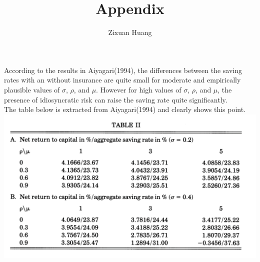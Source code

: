 \documentclass[]{article}
\title{Appendix}
\author{Zixuan Huang}
\begin{document}
\maketitle
According to the results in Aiyagari(1994), the differences between the saving rates with an without insurance are quite small for moderate and empirically plausible values of $\sigma$, $\rho$, and $\mu$. However for high values of $\sigma$, $\rho$, and $\mu$, the presence of idiosyncratic risk can raise the saving rate quite significantly. \\

The table below is extracted from Aiyagari(1994) and clearly shows this point. 
\centering
\includegraphics[scale=0.5]{Table-Aiyagari}
\end{document}
